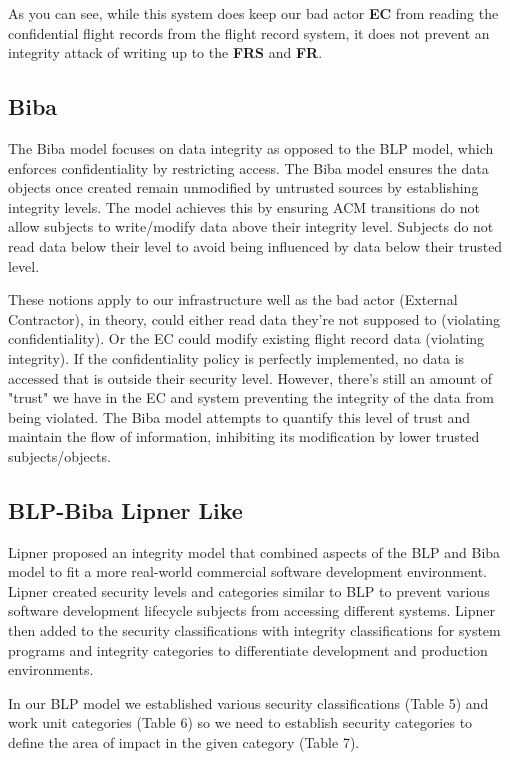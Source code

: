 \documentclass[10pt,journal,compsoc]{IEEEtran}
\begin{document}
As you can see, while this system does keep our bad actor \textbf{EC} from reading the confidential flight records from the flight record system, it does not prevent an integrity attack of writing up to the \textbf{FRS} and \textbf{FR}.

\subsection{Biba}

The Biba model focuses on data integrity as opposed to the BLP model, which enforces confidentiality by restricting access. The Biba model ensures the data objects once created remain unmodified by untrusted sources by establishing integrity levels. 
The model achieves this by ensuring ACM transitions do not allow subjects to write/modify data above their integrity level. Subjects do not read data below their level to avoid being influenced by data below their trusted level. 

These notions apply to our infrastructure well as the bad actor (External Contractor), in theory, could either read data they're not supposed to (violating confidentiality). Or the EC could modify existing flight record data (violating integrity). If the confidentiality policy is perfectly implemented, no data is accessed that is outside their security level. However, there's still an amount of "trust" we have in the EC and system preventing the integrity of the data from being violated. The Biba model attempts to quantify this level of trust and maintain the flow of information, inhibiting its modification by lower trusted subjects/objects. 

\subsection{BLP-Biba Lipner Like}

Lipner proposed an integrity model that combined aspects of the BLP and Biba model to fit a more real-world commercial software development environment. Lipner created security levels and categories similar to BLP to prevent various software development lifecycle subjects from accessing different systems. Lipner then added to the security classifications with integrity classifications for system programs and integrity categories to differentiate development and production environments. 

In our BLP model we established various security classifications (Table 5) and work unit categories (Table 6) so we need to establish security categories to define the area of impact in the given category (Table 7).
\end{document}
